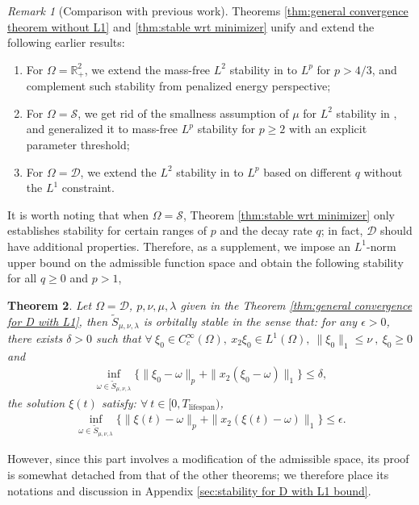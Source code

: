 \documentclass[11pt,letterpaper]{amsart}
\newtheorem{thm}{Theorem}[section]
\theoremstyle{definition}
\theoremstyle{remark}
\newtheorem{remark}[thm]{Remark}
\newcommand{\D}{\mathcal{D}}
\renewcommand{\S}{\mathcal{S}}
\newcommand{\R}{\mathbb{R}}
\renewcommand{\O}{\Omega}
\numberwithin{equation}{section}
\begin{document}
\begin{remark}[Comparison with previous work] Theorems \ref{thm:general convergence theorem without L1} and \ref{thm:stable wrt minimizer} unify and extend the following earlier results:
\begin{enumerate}
    \item For $\O=\R^2_+$, we extend the mass-free $L^2$ stability in \cite{Abe2025StabilityOL} to $L^p$ for $p>4/3$, and complement such stability from penalized energy perspective;
    \item For $\O=\S$, we get rid of the smallness assumption of $\mu$ for $L^2$ stability in \cite{Dong2026StabilityOV}, and generalized it to mass-free $L^p$ stability for $p \geq 2$ with an explicit parameter threshold;
    \item For $\O=\D$, we extend the $L^2$ stability in \cite{Dong2026StabilityOV} to $L^p$ based on different $q$ without the $L^1$ constraint.
\end{enumerate}
\end{remark}

It is worth noting that when $\O=\S$, Theorem \ref{thm:stable wrt minimizer} only establishes stability for certain ranges of $p$ and the decay rate $q$; in fact, $\D$ should have additional properties.
Therefore, as a supplement, we impose an $L^1$-norm upper bound on the admissible function space and obtain the following stability for all $q \geq 0$ and $p > 1$,
\begin{thm}\label{thm:stable wrt minimizer with L1 bound}
    Let $\O=\D$, $p, \nu, \mu, \lambda$ given in the Theorem \ref{thm:general convergence for D with L1}, then $\widetilde{S}_{\mu,\nu,\lambda}$ is orbitally stable in the sense that: for any $\epsilon>0$, there exists $\delta>0$ such that $\forall ~ \xi_0\in C_c^{\infty}(\Omega), ~ x_2\xi_0\in L^1(\Omega), ~ \|\xi_0\|_1\leq \nu ~, ~ \xi_0\geq0$ and 
    \begin{align*}
        \inf_{\omega\in \widetilde{S}_{\mu, \nu, \lambda}}\Big\{ \|\xi_0-\omega\|_{p}+\|x_2(\xi_0-\omega)\|_{1} \Big\}\leq \delta,
    \end{align*}
    the solution $\xi(t)$ satisfy: $\forall ~ t \in [0,T_{\text{lifespan}})$,
    \begin{align}
        \inf_{\omega\in \widetilde{S}_{\mu, \nu, \lambda}}\Big\{ \|\xi(t)-\omega\|_{p}+\|x_2(\xi(t)-\omega)\|_{1} \Big\}\leq \epsilon. \label{eqn:stable result with L1}
    \end{align}
\end{thm}
However, since this part involves a modification of the admissible space, its proof is somewhat detached from that of the other theorems; we therefore place its notations and discussion in Appendix \ref{sec:stability for D with L1 bound}.    
\end{document}
